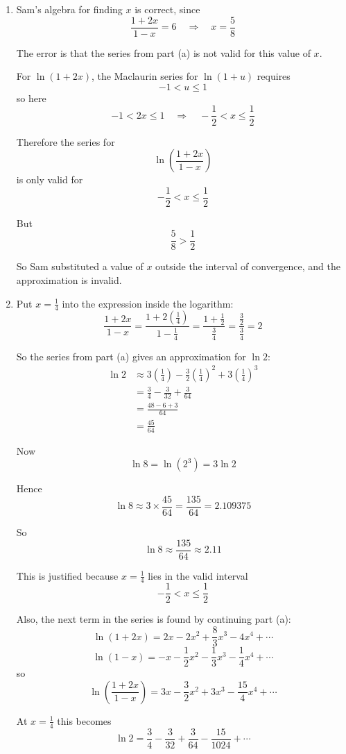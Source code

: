 \documentclass[leqno]{article}
\begin{document}
\begin{enumerate}[
  label=\textbf{\arabic*.},
  leftmargin=*,
  topsep=0pt,
  partopsep=0pt,
  parsep=0pt
]
\begin{tcolorbox}[colback=white, colframe=scarlet, title={\textbf{Solution}}, breakable, grow to left by=6mm, grow to right by=10mm]
\begin{enumerate}[label=\textbf{(\alph*)}]
Hence the first three non-zero terms are
\[
3x-\frac32x^2+3x^3
\]

  \item Sam’s algebra for finding $x$ is correct, since
\[
\frac{1+2x}{1-x}=6 \quad \Rightarrow \quad x=\frac58
\]

The error is that the series from part (a) is not valid for this value of $x$.

For $\ln(1+2x)$, the Maclaurin series for $\ln(1+u)$ requires
\[
-1<u\leq 1
\]
so here
\[
-1<2x\leq 1 \quad \Rightarrow \quad -\frac12<x\leq \frac12
\]

Therefore the series for
\[
\ln\left(\frac{1+2x}{1-x}\right)
\]
is only valid for
\[
-\frac12<x\leq \frac12
\]

But
\[
\frac58>\frac12
\]

So Sam substituted a value of $x$ outside the interval of convergence, and the approximation is invalid.

  \item Put $x=\frac14$ into the expression inside the logarithm:
\[
\frac{1+2x}{1-x}
=\frac{1+2\left(\frac14\right)}{1-\frac14}
=\frac{1+\frac12}{\frac34}
=\frac{\frac32}{\frac34}
=2
\]

So the series from part (a) gives an approximation for $\ln 2$:
\begin{align*}
\ln 2
&\approx 3\left(\frac14\right)-\frac32\left(\frac14\right)^2+3\left(\frac14\right)^3 \\
&=\frac34-\frac{3}{32}+\frac{3}{64} \\
&=\frac{48-6+3}{64} \\
&=\frac{45}{64}
\end{align*}

Now
\[
\ln 8=\ln(2^3)=3\ln 2
\]

Hence
\[
\ln 8 \approx 3\times \frac{45}{64}=\frac{135}{64}=2.109375
\]

So
\[
\ln 8 \approx \frac{135}{64} \approx 2.11
\]

This is justified because $x=\frac14$ lies in the valid interval
\[
-\frac12<x\leq \frac12
\]

Also, the next term in the series is found by continuing part (a):
\[
\ln(1+2x)=2x-2x^2+\frac83x^3-4x^4+\cdots
\]
\[
\ln(1-x)=-x-\frac12x^2-\frac13x^3-\frac14x^4+\cdots
\]
so
\[
\ln\left(\frac{1+2x}{1-x}\right)=3x-\frac32x^2+3x^3-\frac{15}{4}x^4+\cdots
\]

At $x=\frac14$ this becomes
\[
\ln 2=\frac34-\frac{3}{32}+\frac{3}{64}-\frac{15}{1024}+\cdots
\]


\end{enumerate}
\end{tcolorbox}
\end{enumerate}
\end{document}
